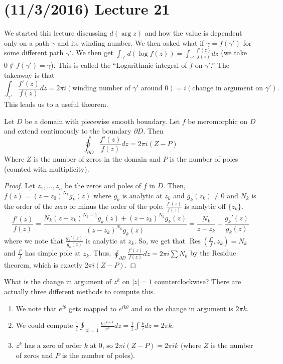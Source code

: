 \documentclass[11pt,leqno,oneside]{amsart}
\numberwithin{thm}{section}
\newcommand{\Res}{\operatorname{Res}}
\begin{document}
  \section{(11/3/2016) Lecture 21}
  We started this lecture discussing $d(\arg z)$ and how the value is
  dependent only on a path $\gamma$ and its winding number. We then
  asked what if $\gamma = f(\gamma')$ for some different path
  $\gamma' $. We then get $\int_{\gamma'} d(\log f(z)) =
  \int_{\gamma'} \frac{f'(z)}{f(z)}dz$ (we take $0 \not\in f(\gamma')
  = \gamma$). This is called the ``Logarithmic integral of $f$ on
  $\gamma'$.'' The takeaway is that \[
    \int_{\gamma'} \frac{f'(z)}{f(z)} dz = 2 \pi i (\text{winding
      number of }\gamma'\text{ around }0) = i(\text{change in argument
    on }\gamma').
  \]
  This leads us to a useful theorem.
  \begin{thm}
    Let $D$ be a domain with piecewise smooth boundary. Let $f$ be
    meromorphic on $D$ and extend continuously to the boundary
    $\partial D$. Then \[
      \oint_{\partial D} \frac{f'(z)}{f(z)} dz = 2\pi i (Z - P)
  \]
  Where $Z$ is the number of zeros in the domain and $P$ is the number
  of poles (counted with multiplicity).
  \end{thm}
  \begin{proof}
    Let $z_1, \ldots, z_n$ be the zeros and poles of $f$ in $D$. Then,
    $f(z) = (z-z_0)^{N_k}g_k(z)$ where $g_k$ is analytic at $z_k$ and
    $g_k(z_k) \neq 0$ and $N_k$ is the order of the zero or minus the
    order of the pole. $\frac{f'(z)}{f(z)}$ is analytic off
    $\{z_k\}$. \[
      \frac{f'(z)}{f(z)} = \frac{N_k(z-z_k)^{N_k-1}g_k(z) +
        (z-z_k)^{N_k}g_k(z)}{(z-z_k)^{N_k}g_k(z)} = \frac{N_k}{z-z_k}
      + \frac{g_k'(z)}{g_k(z)}
    \]
    where we note that $\frac{g_k'(z)}{g_k(z)}$ is analytic at
    $z_k$. So, we get that $\Res(\frac{f'}{f},z_k) = N_k$ and
    $\frac{f'}{f}$ has simple pole at $z_k$. Thus, $\oint_{\partial D}
    \frac{f'(z)}{f(z)}dz = 2 \pi i \sum N_k$ by the Residue theorem,
    which is exactly $2 \pi i (Z-P)$.
  \end{proof}
  \begin{example}
    What is the change in argument of $z^k$ on $|z|=1$
    counterclockwise? There are actually three different methods to
    compute this.
    \begin{enumerate}
    \item We note that $e^{i\theta}$ gets mapped to $e^{ik\theta}$ and
      so the change in argument is $2\pi k$.
    \item We could compute $\frac{1}{i} \oint_{|z|=1}
      \frac{kz^{k-1}}{z^k}dz = \frac{1}{i} \int \frac{k}{z}dz = 2\pi
      k$.
    \item $z^k$ has a zero of order $k$ at 0, so $2\pi i(Z-P) = 2\pi i
      k$ (where $Z$ is the number of zeros and $P$ is the number of
      poles).
    \end{enumerate}
  \end{example}
\end{document}
